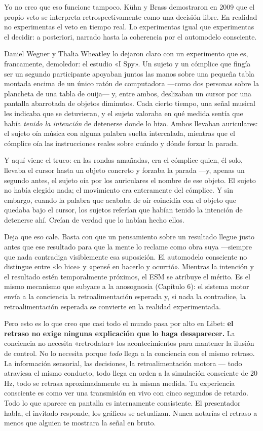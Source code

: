 \documentclass[11pt, twoside, openright]{book}
\begin{document}
Yo no creo que eso funcione tampoco. Kühn y Brass demostraron en 2009 que el propio veto se interpreta retrospectivamente como una decisión libre. En realidad no experimentas el veto en tiempo real. Lo experimentas igual que experimentas el decidir: a posteriori, narrado hasta la coherencia por el automodelo consciente.

Daniel Wegner y Thalia Wheatley lo dejaron claro con un experimento que es, francamente, demoledor: el estudio «I Spy». Un sujeto y un cómplice que fingía ser un segundo participante apoyaban juntos las manos sobre una pequeña tabla montada encima de un único ratón de computadora ---como dos personas sobre la plancheta de una tabla de ouija--- y, entre ambos, deslizaban un cursor por una pantalla abarrotada de objetos diminutos. Cada cierto tiempo, una señal musical les indicaba que se detuvieran, y el sujeto valoraba en qué medida sentía que había \textit{tenido la intención} de detenerse donde lo hizo. Ambos llevaban auriculares: el sujeto oía música con alguna palabra suelta intercalada, mientras que el cómplice oía las instrucciones reales sobre cuándo y dónde forzar la parada.

Y aquí viene el truco: en las rondas amañadas, era el cómplice quien, él solo, llevaba el cursor hasta un objeto concreto y forzaba la parada ---y, apenas un segundo antes, el sujeto oía por los auriculares el nombre de ese objeto. El sujeto no había elegido nada; el movimiento era enteramente del cómplice. Y sin embargo, cuando la palabra que acababa de oír coincidía con el objeto que quedaba bajo el cursor, los sujetos referían que habían tenido la intención de detenerse ahí. Creían de verdad que lo habían hecho ellos.

Deja que eso cale. Basta con que un pensamiento sobre un resultado llegue justo antes que ese resultado para que la mente lo reclame como obra suya ---siempre que nada contradiga visiblemente esa suposición. El automodelo consciente no distingue entre «lo hice» y «pensé en hacerlo y ocurrió». Mientras la intención y el resultado estén temporalmente próximos, el ESM se atribuye el mérito. Es el mismo mecanismo que subyace a la anosognosia (Capítulo 6): el sistema motor envía a la conciencia la retroalimentación esperada y, si nada la contradice, la retroalimentación esperada se convierte en la realidad experimentada.

Pero esto es lo que creo que casi todo el mundo pasa por alto en Libet: \textbf{el retraso no exige ninguna explicación que lo haga desaparecer.} La conciencia no necesita «retrodatar» los acontecimientos para mantener la ilusión de control. No lo necesita porque \textit{todo} llega a la conciencia con el mismo retraso. La información sensorial, las decisiones, la retroalimentación motora --- todo atraviesa el mismo conducto, todo llega en orden a la simulación consciente de 20 Hz, todo se retrasa aproximadamente en la misma medida. Tu experiencia consciente es como ver una transmisión en vivo con cinco segundos de retardo. Todo lo que aparece en pantalla es internamente consistente. El presentador habla, el invitado responde, los gráficos se actualizan. Nunca notarías el retraso a menos que alguien te mostrara la señal en bruto.
\end{document}
